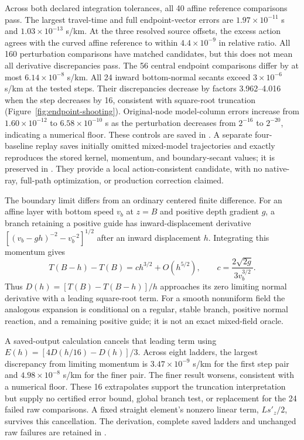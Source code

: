 Across both declared integration tolerances, all 40 affine reference comparisons pass.
The largest travel-time and full endpoint-vector errors are
$1.97\times10^{-11}$ s and $1.03\times10^{-13}$ s/km. At the three resolved
source offsets, the excess action agrees with the curved affine reference to
within $4.4\times10^{-9}$ in relative ratio. All 160 perturbation comparisons
have matched candidates, but this does not mean all derivative discrepancies
pass. The 56 central endpoint comparisons differ by at most
$6.14\times10^{-8}$ s/km. All 24 inward bottom-normal secants exceed
$3\times10^{-6}$ s/km at the tested steps. Their discrepancies decrease by
factors 3.962--4.016 when the step decreases by 16, consistent with square-root
truncation (Figure~\ref{fig:endpoint-shooting}). Original-node model-column
errors increase from $1.60\times10^{-12}$ to $6.58\times10^{-10}$ s as the
perturbation decreases from $2^{-16}$ to $2^{-20}$, indicating a numerical floor.
These controls are saved in
.
A separate four-baseline replay saves initially omitted mixed-model trajectories
and exactly reproduces the stored kernel, momentum, and boundary-secant values;
it is preserved in
.
They provide a local action-consistent candidate, with no native-ray,
full-path optimization, or production correction claimed.

The boundary limit differs from an ordinary centered finite difference.
For an affine layer with bottom speed $v_b$ at $z=B$ and positive depth gradient
$g$, a branch retaining a positive guide has inward-displacement derivative
$[(v_b-g h)^{-2}-v_b^{-2}]^{1/2}$ after an inward displacement $h$.
Integrating this momentum gives
\[
 T(B-h)-T(B)=c h^{3/2}+O(h^{5/2}),\qquad
 c=\frac{2\sqrt{2g}}{3v_b^{3/2}}.
\]
Thus $D(h)=[T(B)-T(B-h)]/h$ approaches its zero limiting normal derivative
with a leading square-root term. For a smooth nonuniform field the analogous
expansion is conditional on a regular, stable branch, positive normal reaction,
and a remaining positive guide; it is not an exact mixed-field oracle.

A saved-output calculation cancels that leading term using
$E(h)=[4D(h/16)-D(h)]/3$. Across eight ladders, the largest discrepancy from
limiting momentum is $3.47\times10^{-9}$ s/km for the first step pair and
$4.98\times10^{-8}$ s/km for the finer pair. The finer result worsens,
consistent with a numerical floor. These 16 extrapolates support the truncation
interpretation but supply no certified error bound, global branch test, or
replacement for the 24 failed raw comparisons. A fixed straight element's
nonzero linear term, $L s'_z/2$, survives this cancellation. The derivation,
complete saved ladders and unchanged raw failures are retained in
.

